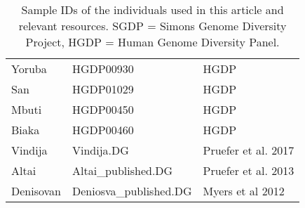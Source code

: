 \begin{table}[ht]
\begin{tabular}{lll}
  Yoruba & HGDP00930 & HGDP \\ 
  San & HGDP01029 & HGDP \\ 
  Mbuti & HGDP00450 & HGDP \\ 
  Biaka & HGDP00460 & HGDP \\ 
  Vindija & Vindija.DG & Pruefer et al. 2017 \\ 
  Altai & Altai\_published.DG & Pruefer et al. 2013 \\ 
  Denisovan & Deniosva\_published.DG & Myers et al 2012 \\ 
   \hline
\end{tabular}
\caption{Sample IDs of the individuals used in this article and relevant resources. SGDP = Simons Genome Diversity Project, HGDP = Human Genome Diversity Panel.} 
\label{samples}
\end{table}
